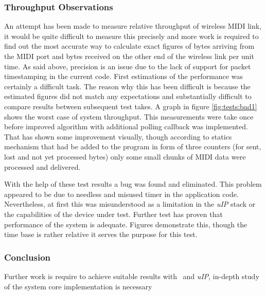  

\subsubsection{Throughput Observations}

  An attempt has been made to measure relative throughput of wireless MIDI
 link, it would be quite difficult to measure this precisely and more work
 is required to find out the most accurate way to calculate exact figures
 of bytes arriving from the MIDI port and bytes received on the other end
 of the wireless link per unit time. As said above, precision is an issue
 due to the lack of support for packet timestamping in the current code.
 First estimations of the performance was certainly a difficult task.
 The reason why this has been difficult is because the estimated figures
 did not match any expectations and substantially difficult to compare
 results between subsequent test takes.
  A graph in figure \ref{fig:tests:bad1} shows the worst case of system
 throughput. This measurements were take once before improved algorithm
 with additional polling callback was implemented. That has shown some
 improvement visually, though according to statics mechanism that had be
 added to the program in form of three counters (for sent, lost and not
 yet processed bytes) only some small chunks of MIDI data were processed
 and delivered.


  With the help of these test results a bug was found and eliminated.
 This problem appeared to be due to needless and misused timer in the
 application code. Nevertheless, at first this was misunderstood as a
 limitation in the \emph{uIP} stack or the capabilities of the device
 under test. Further test has proven that performance of the system is
 adequate. Figures \cite{fig:tests:good1,fig:tests:good2} demonstrate
 this, though the time base is rather relative it serves the purpose
 for this test.
 
 




\subsubsection{Conclusion}

 Further work is require to achieve suitable results with \Contiki\ and
 \emph{uIP}, in-depth study of the system core implementation is necessary

